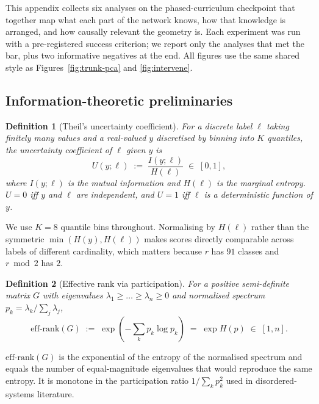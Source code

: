\documentclass[11pt]{article}
\theoremstyle{papsty}
\newtheorem{definition}{Definition}
\newcommand{\Erank}{\mathrm{eff\text{-}rank}}
\begin{document}
This appendix collects six analyses on the phased-curriculum
checkpoint that together map what each part of the network knows, how
that knowledge is arranged, and how causally relevant the geometry is.
Each experiment was run with a pre-registered success criterion; we
report only the analyses that met the bar, plus two informative
negatives at the end. All figures use the same shared style as
Figures~\ref{fig:trunk-pca} and \ref{fig:intervene}.

\subsection{Information-theoretic preliminaries}
\label{app:theil}

\begin{definition}[Theil's uncertainty coefficient]
\label{def:theil}
For a discrete label $\ell$ taking finitely many values and a
real-valued $y$ discretised by binning into $K$ quantiles, the
\emph{uncertainty coefficient} of $\ell$ given $y$ is
\begin{equation}
U(y; \ell) \;:=\; \frac{I(y; \ell)}{H(\ell)} \;\in\; [0, 1],
\end{equation}
where $I(y; \ell)$ is the mutual information and $H(\ell)$ is the
marginal entropy. $U = 0$ iff $y$ and $\ell$ are independent, and $U = 1$
iff $\ell$ is a deterministic function of $y$.
\end{definition}

We use $K = 8$ quantile bins throughout. Normalising by $H(\ell)$ rather
than the symmetric $\min(H(y), H(\ell))$ makes scores directly
comparable across labels of different cardinality, which matters because
$r$ has $91$ classes and $r\!\bmod 2$ has $2$.

\begin{definition}[Effective rank via participation]
\label{def:erank}
For a positive semi-definite matrix $G$ with eigenvalues
$\lambda_1 \ge \dots \ge \lambda_n \ge 0$ and normalised spectrum
$p_k = \lambda_k / \sum_j \lambda_j$,
\begin{equation}
\Erank(G) \;:=\; \exp\!\left(-\sum_k p_k \log p_k\right)
            \;=\; \exp H(p) \;\in\; [1, n].
\end{equation}
\end{definition}

$\Erank(G)$ is the exponential of the entropy of the normalised
spectrum and equals the number of equal-magnitude eigenvalues that would
reproduce the same entropy. It is monotone in the participation ratio
$1 / \sum_k p_k^2$ used in disordered-systems literature.
\end{document}
